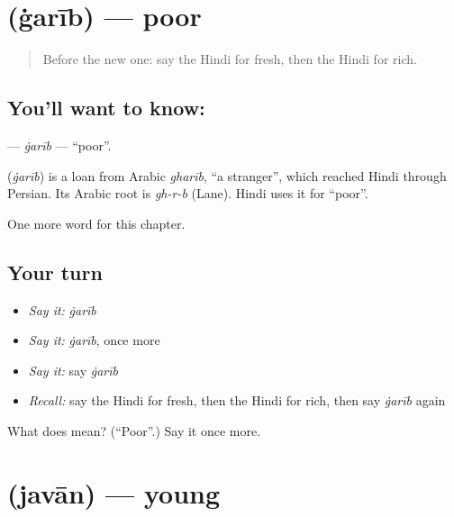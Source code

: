 \section[\texorpdfstring{\hi{ग़रीब} (ġarīb)}{ग़रीब (ġarīb)}]{ (ġarīb) — poor}

\label{lesson:HI-C157-garib}



\begin{quote}
Before the new one: say the Hindi for fresh, then the Hindi for rich.
\end{quote}

\subsection*{You'll want to know: }
\textbf{} — \emph{ġarīb} — \textquotedblleft{}poor\textquotedblright{}.

\begin{cousinweb}
\textbf{} (\emph{ġarīb}) is a loan from Arabic \emph{gharīb}, \textquotedblleft{}a stranger\textquotedblright{}, which reached Hindi through Persian. Its Arabic root is \emph{gh-r-b} (Lane). Hindi uses it for \textquotedblleft{}poor\textquotedblright{}.
\end{cousinweb}

\begin{grammarlens}[title={What you've built}]
One more word for this chapter.
\end{grammarlens}

\subsection*{Your turn}
\begin{itemize}
\raggedright
  \item \emph{Say it:} \emph{ġarīb}
  \item \emph{Say it:} \emph{ġarīb}, once more
  \item \emph{Say it:} say \emph{ġarīb}
  \item \emph{Recall:} say the Hindi for fresh, then the Hindi for rich, then say \emph{ġarīb} again
\end{itemize}

\begin{tcolorbox}[breakable,colback=teal!4,colframe=teal!35!black,title={Before you move on}]
What does  mean? (\textquotedblleft{}Poor\textquotedblright{}.) Say it once more.
\end{tcolorbox}
\section[\texorpdfstring{\hi{जवान} (javān)}{जवान (javān)}]{ (javān) — young}

